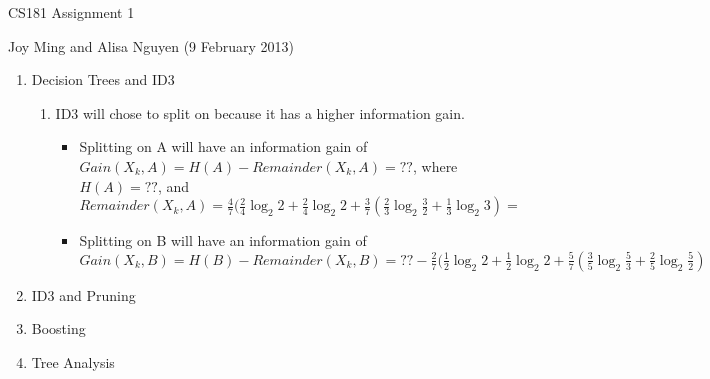 \documentclass[11pt]{article}
\begin{document}
\begin{center}
\large
CS181 Assignment 1
\end{center}
Joy Ming and Alisa Nguyen (9 February 2013)\\

\begin{enumerate}
\setcounter{enumi}{0}

\item Decision Trees and ID3
\begin{enumerate}
\item ID3 will chose to split on  because it has a higher information gain.
\begin{itemize}
\item Splitting on A will have an information gain of $Gain(X_k,A)=H(A)-Remainder(X_k,A)=??$, where $H(A) = ??$, and $Remainder(X_k,A)=\frac{4}{7}(\frac{2}{4}\log_2 2+\frac{2}{4}\log_2 2+\frac{3}{7}(\frac{2}{3}\log_2 \frac{3}{2} + \frac{1}{3}\log_2 3) = $
\item Splitting on B will have an information gain of $Gain(X_k,B)=H(B)-Remainder(X_k,B)=?? - \frac{2}{7}(\frac{1}{2}\log_2 2+\frac{1}{2}\log_2 2+\frac{5}{7}(\frac{3}{5}\log_2 \frac{5}{3} + \frac{2}{5}\log_2 \frac{5}{2})$
\end{itemize}
\end{enumerate}

\item ID3 and Pruning

\item Boosting

\item Tree Analysis

\end{enumerate}
\end{document}

